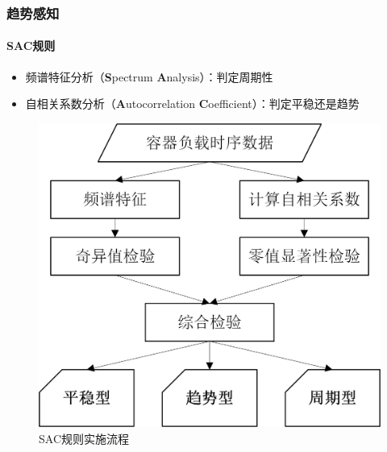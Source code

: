 \begin{frame}
\frametitle{趋势感知}
\framesubtitle{SAC规则}
\begin{itemize}
    \item 频谱特征分析（\textbf{S}pectrum \textbf{A}nalysis）：判定周期性
    \item 自相关系数分析（\textbf{A}utocorrelation \textbf{C}oefficient）：判定平稳还是趋势
\end{itemize}
\begin{figure}[htb]
\centering
\includegraphics[scale=0.6]{figures/fig8_sac_process.jpg}
\caption{SAC规则实施流程}
\label{fig:fig8}
\end{figure}
\end{frame}

